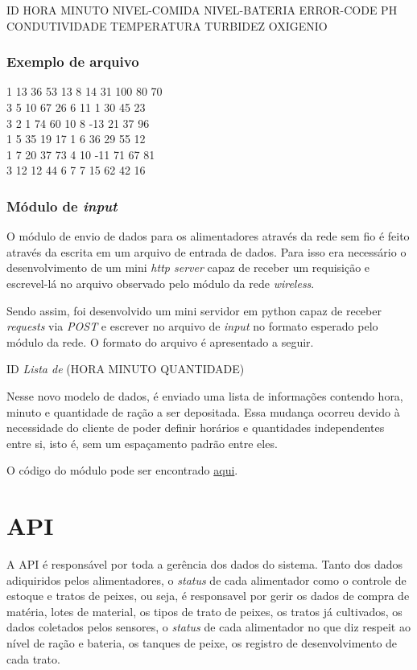 ID HORA MINUTO NIVEL-COMIDA NIVEL-BATERIA ERROR-CODE PH CONDUTIVIDADE TEMPERATURA TURBIDEZ OXIGENIO

\subsubsection{Exemplo de arquivo}

1 13 36 53 13 8 14 31 100 80 70\\
3 5 10 67 26 6 11 1 30 45 23\\
3 2 1 74 60 10 8 -13 21 37 96\\
1 5 35 19 17 1 6 36 29 55 12\\
1 7 20 37 73 4 10 -11 71 67 81\\
3 12 12 44 6 7 7 15 62 42 16\\

\subsubsection{Módulo de \textit{input}}

O módulo de envio de dados para os alimentadores através da rede sem fio é feito através da escrita em um arquivo de entrada de dados. Para isso era necessário o desenvolvimento de um mini \textit{http server} capaz de receber um requisição e escrevel-lá no arquivo observado pelo módulo da rede \textit{wireless}.

Sendo assim, foi desenvolvido um mini servidor em python capaz de receber \textit{requests} via \textit{POST} e escrever no arquivo de \textit{input} no formato esperado pelo módulo da rede. O formato do arquivo é apresentado a seguir.

ID \textit{Lista de} (HORA MINUTO QUANTIDADE)

Nesse novo modelo de dados, é enviado uma lista de informações contendo hora, minuto e quantidade de ração a ser depositada. Essa mudança ocorreu devido à necessidade do cliente de poder definir horários e quantidades independentes entre si, isto é, sem um espaçamento padrão entre eles.

O código do módulo pode ser encontrado \href{https://github.com/PI2-Crema/parse-base-module}{aqui}.

\section{API}

A API é responsável por toda a gerência dos dados do sistema. Tanto dos dados adiquiridos pelos alimentadores, o \textit{status} de cada alimentador como o controle de estoque e tratos de peixes, ou seja, é responsavel por gerir os dados de compra de matéria, lotes de material, os tipos de trato de peixes, os tratos já cultivados, os dados coletados pelos sensores, o \textit{status} de cada alimentador no que diz respeit ao nível de ração e bateria, os tanques de peixe, os registro de desenvolvimento de cada trato.

